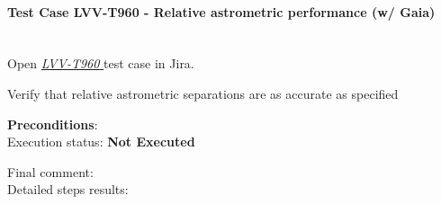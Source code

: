 \documentclass[DM,lsstdraft,STR,toc]{lsstdoc}
\begin{document}
\paragraph{Test Case LVV-T960 - Relative astrometric performance (w/ Gaia)
 }\mbox{}\\

Open  \href{https://jira.lsstcorp.org/secure/Tests.jspa#/testCase/LVV-T960}{\textit{ LVV-T960 } }
test case in Jira.

Verify that relative astrometric separations are as accurate as
specified


\textbf{ Preconditions}:\\


Execution status: {\bf Not Executed }

Final comment:\\


Detailed steps results:
\end{document}
